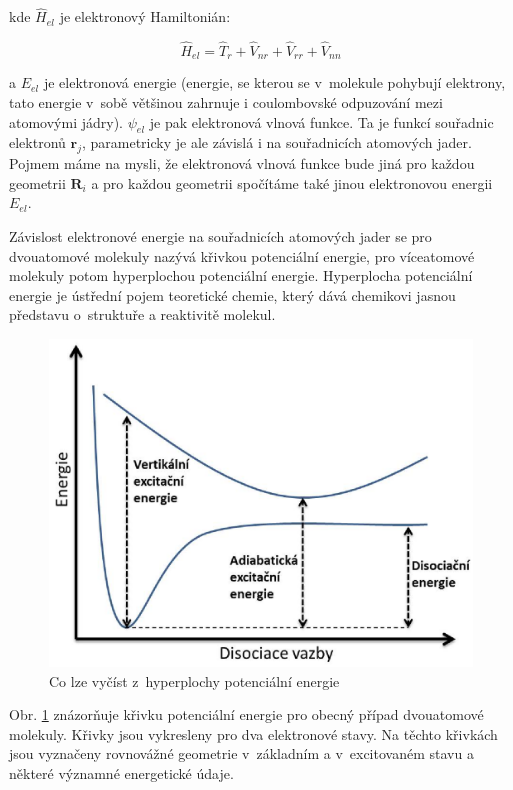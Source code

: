\noindent kde $\hat{H}_{el}$ je elektronový Hamiltonián:

\begin{equation}
\hat{H}_{el}=\hat{T}_r+\hat{V}_{nr}+\hat{V}_{rr}+\hat{V}_{nn}
\end{equation}

\noindent a $E_{el}$ je elektronová energie (energie, se kterou se v~molekule pohybují elektrony, tato energie v~sobě většinou zahrnuje i coulombovské odpuzování mezi atomovými jádry). $\psi_{el}$ je pak elektronová vlnová funkce. Ta je funkcí souřadnic elektronů $\textbf{r}_j$, parametricky je ale závislá i na souřadnicích atomových jader. Pojmem  máme na mysli, že elektronová vlnová funkce bude jiná pro každou geometrii $\textbf{R}_i$ a pro každou geometrii spočítáme také jinou elektronovou energii $E_{el}$. 

Závislost elektronové energie na souřadnicích atomových jader se pro dvouatomové molekuly nazývá křivkou potenciální energie, pro víceatomové molekuly potom hyperplochou potenciální energie. Hyperplocha potenciální energie je ústřední pojem teoretické chemie, který dává chemikovi jasnou představu o~struktuře a reaktivitě molekul. 

\begin{figure} [ht]
\centering
\includegraphics[scale=0.6]{obrazky/disociace2.eps}
\caption[disociace2]{Co lze vyčíst z~hyperplochy potenciální energie}
\label{obr:mol:disociace2}
\end{figure}

Obr. \ref{obr:mol:disociace2} znázorňuje křivku potenciální energie pro obecný případ dvouatomové molekuly. Křivky jsou vykresleny pro dva elektronové stavy. Na těchto křivkách jsou vyznačeny rovnovážné geometrie v~základním a v~excitovaném stavu a některé významné energetické údaje.


